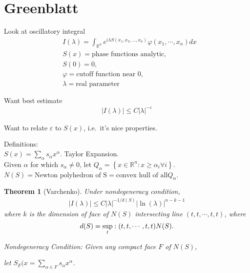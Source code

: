 \documentclass[12pt,reqno]{amsart}
\numberwithin{equation}{section}  %
\newcommand{\nin}{\noindent}
\newcommand{\rr}{\mathbb{R}}
\newcommand{\ee}{\varepsilon}
\newcommand{\vp}{\varphi}
\newtheorem{theorem}{Theorem}[section]
\begin{document}
\section{Greenblatt}
\begin{itemize}
    \item{}
	Look at oscillatory integral
	\begin{equation*}
	    \begin{split}
		& I(\lambda) = \int_{\rr^{n}} e^{i \lambda S(x_{1}, x_{2}, \ldots, x_{n})} \vp(x_{1}, \cdots, x_{n}) dx
		\\
		& S(x) = \text{phase functions analytic},
		\\
		& S(0) = 0, 
		\\
		& \vp = \text{cutoff function near 0}, 
		\\
		& \lambda=\text{real parameter}
	    \end{split}
	\end{equation*}
    \item{}
	Want best estimate
	\begin{gather*}
	    | I(\lambda) | \le C| \lambda |^{-\ee}
	\end{gather*}
    \item{}
	Want to relate $\ee$ to $S(x)$, i.e.\ it's nice properties.
    \item Definitions:
	\\
	$S(x) = \sum_{\alpha} s_{\alpha} x^{\alpha}$. Taylor Expansion.
	\\
	Given $\alpha$ for which $s_{\alpha}\neq 0$, let $Q_\alpha = \left\{ x \in \rr^{n}: x \ge \alpha_{i} \forall i \right\}$.
	\\
	$N(S) = \text{Newton polyhedron of S}= \text{convex hull of all} Q_{\alpha}$.
	\begin{theorem}[Varchenko]
	    Under nondegeneracy condition,
	    \begin{gather*}
		| I(\lambda) | \le C| \lambda |^{-1/d(S)} | \ln(\lambda) |^{n-k-1}
	    \end{gather*}
	    where $k$ is the dimension of face of $N(S)$ intersecting line $(t, t, \cdots, t, t)$, where
	    \begin{gather*}
		d(S) = \sup_{t}: (t, t, \cdots, t, t) \nin N(S).
	    \end{gather*}
	\item{}
	    Nondegeneracy Condition: Given any compact face $F$ of $N(S)$,

	    let $S_{F}(x = \sum_{\alpha \in F} s_{\alpha} x^{\alpha}$. 


\end{theorem}
\end{itemize}
\end{document}
